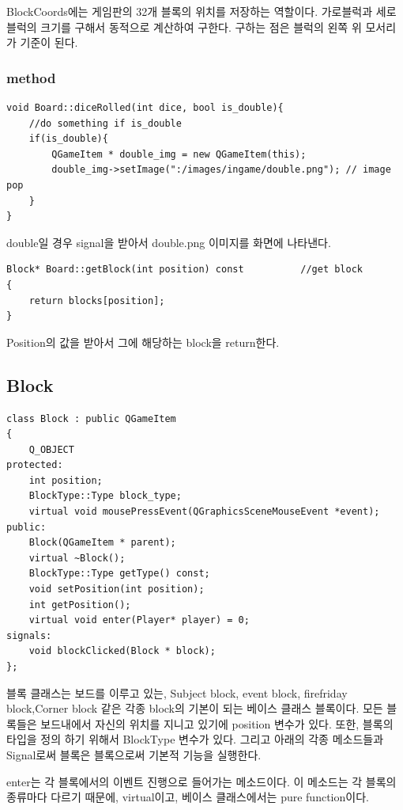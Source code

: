 \documentclass[10pt,oneside,a4paper,titlepage]{article}
\begin{document}
BlockCoords에는 게임판의 32개 블록의 위치를 저장하는 역할이다. 가로블럭과 세로 블럭의 크기를 구해서 동적으로 계산하여 구한다. 구하는 점은 블럭의 왼쪽 위 모서리가 기준이 된다. 

\subsubsection{method}

\begin{lstlisting}
void Board::diceRolled(int dice, bool is_double){
    //do something if is_double
    if(is_double){
        QGameItem * double_img = new QGameItem(this);
        double_img->setImage(":/images/ingame/double.png"); // image pop
    }
}
\end{lstlisting}

double일 경우 signal을 받아서 double.png 이미지를 화면에 나타낸다.\\


\begin{lstlisting}
Block* Board::getBlock(int position) const          //get block
{
    return blocks[position];
}

\end{lstlisting}

Position의 값을 받아서 그에 해당하는 block을 return한다.




\subsection{Block}

\begin{lstlisting}
class Block : public QGameItem
{
    Q_OBJECT
protected:
    int position;
    BlockType::Type block_type;
    virtual void mousePressEvent(QGraphicsSceneMouseEvent *event);
public:
    Block(QGameItem * parent);
    virtual ~Block();
    BlockType::Type getType() const;
    void setPosition(int position);
    int getPosition();
    virtual void enter(Player* player) = 0;
signals:
    void blockClicked(Block * block);
};
\end{lstlisting}
블록 클래스는 보드를 이루고 있는, Subject block, event block, firefriday block,Corner block 같은 각종 block의 기본이 되는 베이스 클래스 블록이다. 모든 블록들은 보드내에서 자신의 위치를 지니고 있기에 position 변수가 있다. 또한, 블록의 타입을 정의 하기 위해서 BlockType 변수가 있다. 그리고 아래의 각종 메소드들과 Signal로써 블록은 블록으로써 기본적 기능을 실행한다.

enter는 각 블록에서의 이벤트 진행으로 들어가는 메소드이다. 이 메소드는 각 블록의 종류마다 다르기 때문에, virtual이고, 베이스 클래스에서는 pure function이다. 
\end{document}
